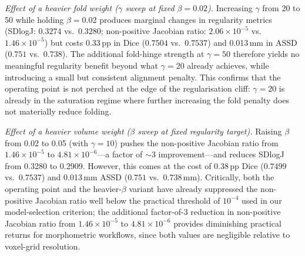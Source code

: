 \documentclass[jimaging,article,submit,pdftex,moreauthors]{Definitions/mdpi}
\begin{document}
\textit{Effect of a heavier fold weight (\(\gamma\) sweep at fixed \(\beta=0.02\)).}
Increasing \(\gamma\) from 20 to 50 while holding \(\beta=0.02\) produces marginal changes in regularity metrics (SDlogJ: \(0.3274\) vs.\ \(0.3280\); non-positive Jacobian ratio: \(2.06\times10^{-5}\) vs.\ \(1.46\times10^{-5}\)) but costs 0.33\,pp in Dice (\(0.7504\) vs.\ \(0.7537\)) and 0.013\,mm in ASSD (\(0.751\) vs.\ \(0.738\)).
The additional fold-hinge strength at \(\gamma=50\) therefore yields no meaningful regularity benefit beyond what \(\gamma=20\) already achieves, while introducing a small but consistent alignment penalty.
This confirms that the operating point is not perched at the edge of the regularisation cliff: \(\gamma=20\) is already in the saturation regime where further increasing the fold penalty does not materially reduce folding.

\textit{Effect of a heavier volume weight (\(\beta\) sweep at fixed regularity target).}
Raising \(\beta\) from 0.02 to 0.05 (with \(\gamma=10\)) pushes the non-positive Jacobian ratio from \(1.46\times10^{-5}\) to \(4.81\times10^{-6}\)---a factor of \({\sim}3\) improvement---and reduces SDlogJ from 0.3280 to 0.2909.
However, this comes at the cost of 0.38\,pp Dice (\(0.7499\) vs.\ \(0.7537\)) and 0.013\,mm ASSD (\(0.751\) vs.\ \(0.738\,\)mm).
Critically, both the operating point and the heavier-\(\beta\) variant have already suppressed the non-positive Jacobian ratio well below the practical threshold of \(10^{-4}\) used in our model-selection criterion; the additional factor-of-3 reduction in non-positive Jacobian ratio from \(1.46\times10^{-5}\) to \(4.81\times10^{-6}\) provides diminishing practical returns for morphometric workflows, since both values are negligible relative to voxel-grid resolution.
\end{document}
